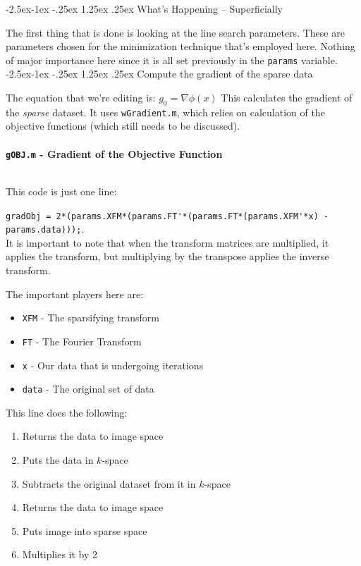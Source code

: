 \documentclass[11 pt]{article}
\makeatletter
\renewcommand\paragraph{\@startsection{paragraph}{4}{\z@}%
            {-2.5ex\@plus -1ex \@minus -.25ex}%
            {1.25ex \@plus .25ex}%
            {\normalfont\normalsize\bfseries}}
\renewcommand\subparagraph{\@startsection{subparagraph}{5}{\z@}%
            {-2.5ex\@plus -1ex \@minus -.25ex}%
            {1.25ex \@plus .25ex}%
            {\normalfont\normalsize\bfseries}}
\newcommand{\bo}{\noindent\textbf}
\makeatother
\begin{document}
      \paragraph{What's Happening -- Superficially}

        The first thing that is done is looking at the line search parameters. These are parameters chosen for the minimization technique that's employed here. Nothing of major importance here since it is all set previously in the \texttt{params} variable.\\

        \subparagraph{Compute the gradient of the sparse data}

         The equation that we're editing is: $g_0 = \nabla\phi(x)$
         This calculates the gradient of the \emph{sparse} dataset. It uses \texttt{wGradient.m}, which relies on calculation of the objective functions (which still needs to be discussed). \\\\

          \bo{\texttt{gOBJ.m} - Gradient of the Objective Function}
            
            \hfill\\
            \noindent This code is just one line:

            \verb!gradObj = 2*(params.XFM*(params.FT'*(params.FT*(params.XFM'*x) - params.data)));!. \\

            It is important to note that when the transform matrices are multiplied, it applies the transform, but multiplying by the transpose applies the inverse transform.

            The important players here are:
            \begin{itemize}
              \item \texttt{XFM} - The sparsifying transform
              \item \texttt{FT} - The Fourier Transform
              \item \texttt{x} - Our data that is undergoing iterations
              \item \texttt{data} - The original set of data
              \end{itemize}

            This line does the following:

            \begin{enumerate}
              \item Returns the data to image space
              \item Puts the data in $k$-space
              \item Subtracts the original dataset from it in $k$-space
              \item Returns the data to image space
              \item Puts image into sparse space
              \item Multiplies it by 2
              \end{enumerate}
\end{document}

